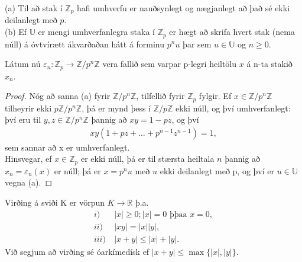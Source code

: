 \begin{setn}
 (a) Til að stak í $\mathbb{Z}_p$ hafi umhverfu er nauðsynlegt og nægjanlegt 
að það sé ekki deilanlegt með $p$.\\
 (b) Ef $\mathbb{U}$ er mengi umhverfanlegra staka í $\mathbb{Z}_p$ er hægt að 
skrifa hvert stak (nema núll) á óvtvírætt ákvarðaðan hátt á forminu $p^nu$ þar
 sem $u \in \mathbb{U}$ og $n\geq 0$.
\end{setn}
Látum nú $\varepsilon_n : \mathbb{Z}_p \rightarrow \mathbb{Z}/p^n 
\mathbb{Z}$ vera fallið sem varpar p-legri heiltölu $x$ á n-ta stakið $x_n$.
\begin{proof}
 Nóg að sanna (a) fyrir $\mathbb{Z}/p^n\mathbb{Z}$, tilfellið fyrir 
$\mathbb{Z}_p$ fylgir. Ef $x \in \mathbb{Z}/p^n\mathbb{Z}$ tilheyrir 
ekki $p\mathbb{Z}/p^n\mathbb{Z}$, þá er mynd þess í 
$\mathbb{Z}/p\mathbb{Z}$ ekki núll, og því umhverfanlegt: 
því eru til $y,z \in \mathbb{Z}/p^n\mathbb{Z}$ þannig að 
$xy = 1-pz$, og því 
\begin{align*}
 xy(1+pz+\ldots+p^{n-1}z^{n-1}) = 1,
\end{align*}
sem sannar að x er umhverfanlegt.\\
Hinsvegar, ef $x \in \mathbb{Z}_p$ er ekki núll, þá er til stærsta heiltala 
$n$ þannig að $x_n = \varepsilon_n(x)$ er núll; þá er $x = p^nu$ með $u$ ekki 
deilanlegt með p, og því er $u \in \mathbb{U}$ vegna (a). 
\end{proof}
\begin{skilgr}
 Virðing á sviði K er vörpun $K \rightarrow \mathbb{R}$ þ.a.
\begin{align*}
 i)& \  |x|\geq 0; |x| = 0 \mbox{ þþaa } x = 0, \\
 ii)& \  |xy| = |x||y|, \\
 iii)& \  |x+y| \leq |x| + |y|.
\end{align*}
Við segjum að virðing sé óarkímedísk ef $|x+y| \leq \max \{ |x|,|y| \}$.
\end{skilgr}
